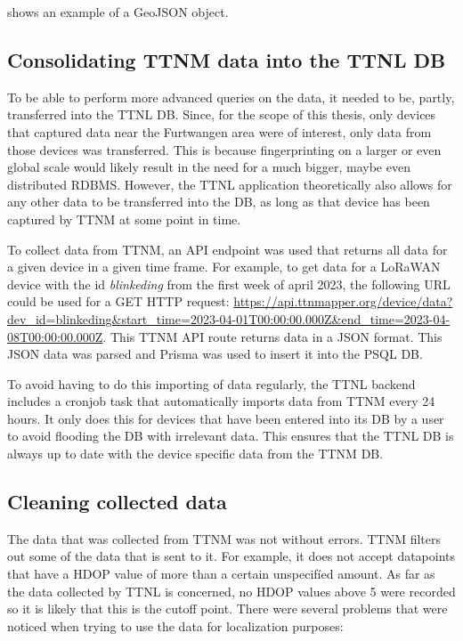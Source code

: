  shows an example of a GeoJSON object.

\subsection{Consolidating \acl{TTNM} data into the \acl{TTNL} \acl{DB}}

To be able to perform more advanced queries on the data, it needed to be, partly, transferred into the \ac{TTNL} \acl{DB}.
Since, for the scope of this thesis, only devices that captured data near the Furtwangen area were of interest, only data from those devices was transferred.
This is because fingerprinting on a larger or even global scale would likely result in the need for a much bigger, maybe even distributed \ac{RDBMS}.
However, the \ac{TTNL} application theoretically also allows for any other data to be transferred into the \ac{DB}, as long as that device has been captured by \ac{TTNM} at some point in time.

To collect data from \ac{TTNM}, an \ac{API} endpoint was used that returns all data for a given device in a given time frame.
For example, to get data for a \ac{LoRaWAN} device with the id \emph{blinkeding} from the first week of april 2023, the following \ac{URL} could be used for a GET \ac{HTTP} request: \url{https://api.ttnmapper.org/device/data?dev_id=blinkeding&start_time=2023-04-01T00:00:00.000Z&end_time=2023-04-08T00:00:00.000Z}.
This \ac{TTNM} \ac{API} route returns data in a \ac{JSON} format.
This \ac{JSON} data was parsed and Prisma was used to insert it into the \ac{PSQL} \ac{DB}.

To avoid having to do this importing of data regularly, the \ac{TTNL} backend includes a cronjob task that automatically imports data from \ac{TTNM} every 24 hours.
It only does this for devices that have been entered into its \ac{DB} by a user to avoid flooding the \ac{DB} with irrelevant data.
This ensures that the \ac{TTNL} \ac{DB} is always up to date with the device specific data from the \ac{TTNM} \ac{DB}.

\subsection{Cleaning collected data}

The data that was collected from \ac{TTNM} was not without errors.
\ac{TTNM} filters out some of the data that is sent to it.
For example, it does not accept datapoints that have a \ac{HDOP} value of more than a certain unspecifíed amount.
As far as the data collected by \ac{TTNL} is concerned, no \ac{HDOP} values above 5 were recorded so it is likely that this is the cutoff point.
There were several problems that were noticed when trying to use the data for localization purposes:

